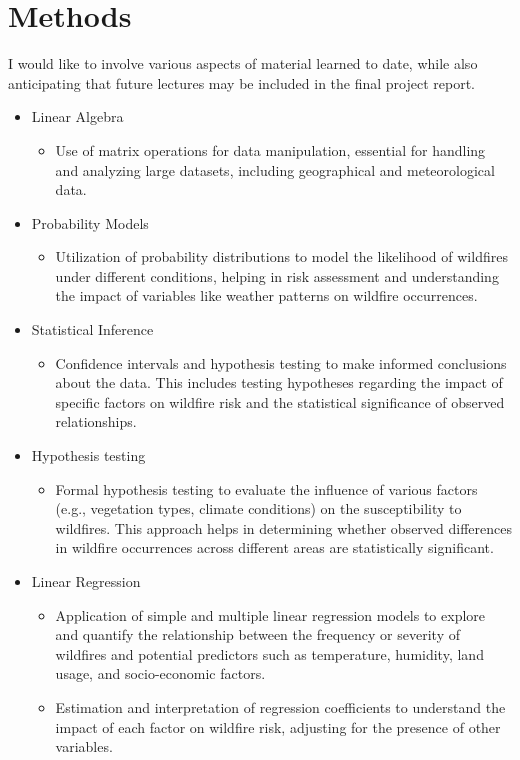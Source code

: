 \section{Methods}
I would like to involve various aspects of material learned to date, while also anticipating that future lectures may be included in the final project report.

\begin{itemize}
    \item Linear Algebra
    \begin{itemize}
        \item Use of matrix operations for data manipulation, essential for handling and analyzing large datasets, including geographical and meteorological data.
    \end{itemize}
    \item Probability Models
    \begin{itemize}
        \item Utilization of probability distributions to model the likelihood of wildfires under different conditions, helping in risk assessment and understanding the impact of variables like weather patterns on wildfire occurrences.
    \end{itemize}
    \item Statistical Inference
    \begin{itemize}
        \item Confidence intervals and hypothesis testing to make informed conclusions about the data. This includes testing hypotheses regarding the impact of specific factors on wildfire risk and the statistical significance of observed relationships.
    \end{itemize}
    \item Hypothesis testing
    \begin{itemize}
        \item Formal hypothesis testing to evaluate the influence of various factors (e.g., vegetation types, climate conditions) on the susceptibility to wildfires. This approach helps in determining whether observed differences in wildfire occurrences across different areas are statistically significant.
    \end{itemize}
    \item Linear Regression
    \begin{itemize}
        \item Application of simple and multiple linear regression models to explore and quantify the relationship between the frequency or severity of wildfires and potential predictors such as temperature, humidity, land usage, and socio-economic factors.
        \item Estimation and interpretation of regression coefficients to understand the impact of each factor on wildfire risk, adjusting for the presence of other variables.
    \end{itemize}
\end{itemize}

